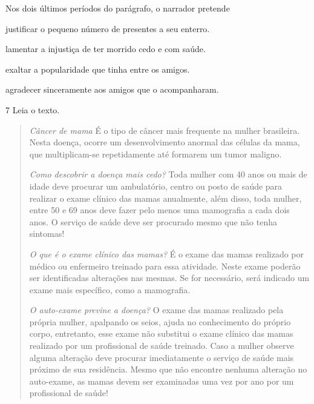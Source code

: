 
Nos dois últimos períodos do parágrafo, o narrador pretende 

\begin{escolha}

    \item justificar o pequeno número de presentes a seu enterro. 

    \item lamentar a injustiça de ter morrido cedo e com saúde.

    \item exaltar a popularidade que tinha entre os amigos.

    \item agradecer sinceramente aos amigos que o acompanharam.

\end{escolha}

\num{7} Leia o texto. 


\begin{quote}

\textit{Câncer de mama}
É o tipo de câncer mais frequente na mulher brasileira. Nesta doença,
ocorre um desenvolvimento anormal das células da mama, que
multiplicam-se repetidamente até formarem um tumor maligno.

\textit{Como descobrir a doença mais cedo?}
Toda mulher com 40 anos ou mais de idade deve procurar um ambulatório,
centro ou posto de saúde para realizar o exame clínico das mamas
anualmente, além disso, toda mulher, entre 50 e 69 anos deve fazer pelo
menos uma mamografia a cada dois anos. O serviço de saúde deve ser
procurado mesmo que não tenha sintomas!

\textit{O que é o exame clínico das mamas?}
É o exame das mamas realizado por médico ou enfermeiro treinado para
essa atividade. Neste exame poderão ser identificadas alterações nas
mesmas. Se for necessário, será indicado um exame mais específico, como
a mamografia.

\textit{O auto-exame previne a doença?}
O exame das mamas realizado pela própria mulher, apalpando os seios,
ajuda no conhecimento do próprio corpo, entretanto, esse exame não
substitui o exame clínico das mamas realizado por um profissional de
saúde treinado. Caso a mulher observe alguma alteração deve procurar
imediatamente o serviço de saúde mais próximo de sua residência. Mesmo
que não encontre nenhuma alteração no auto-exame, as mamas devem ser
examinadas uma vez por ano por um profissional de saúde!

\end{quote}

